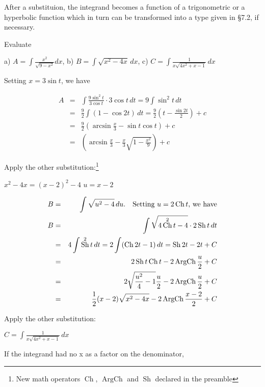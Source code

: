 \documentclass[11pt]{amsbook}
\DeclareMathOperator{\Ch}{Ch}
\DeclareMathOperator{\Sh}{Sh}
\DeclareMathOperator{\ArgCh}{ArgCh}
\begin{document}

After a substituion, the integrand becomes a function of a trigonometric or a hyperbolic function which in turn can be transformed into a type given in §7.2, if necessary.

\begin{exmp}
Evaluate\\
\par a) $A = \int \frac{x^2}{\sqrt{9-x^2}} dx $, 
\quad b) $B = \int \sqrt{x^2-4x}\, dx $,
\quad c) $C = \int \frac{1}{x\sqrt{4x^2+x-1}}\,dx$
\end{exmp}

\begin{hSolution}
\begin{hEnumerateAlpha}
\item Setting $x=3 \sin t$, we have

\begin{eqnarray*}
    A &=& \int \frac{9 \sin^2 t}{3 \cos t}\cdot 3\cos t \,dt = 9 \int \sin^2 t\, dt\\
    &=& \frac{9}{2}\int (1-\cos 2t) \,dt = \frac{9}{2}(t-\frac{\sin 2t}{2})+c\\
    &=& \frac{9}{2} (\arcsin \frac{x}{3}-\sin t \cos t)+c\\
    &=& (\arcsin \frac{x}{3} -\frac{x}{3}\sqrt{1-\frac{x^2}{9}})+c
\end{eqnarray*}

\par Apply the other substitution:\footnote{New math operators $\Ch$, $\ArgCh$ and $\Sh$ declared in the preamble}\\
\item \quad \quad $x^2-4x = (x-2)^2-4$ \quad \quad $u=x-2$

\begin{eqnarray*}
    B &=& \int \sqrt{u^2-4} \,du \text{.\quad Setting } u=2 \Ch t\text{, we have}\\
    B &=& \int \sqrt{4 \Ch^2 t-4} \cdot 2 \Sh t\, dt\\
    &=& 4 \int \Sh^2t \,dt = 2 \int (\Ch 2t-1) \,dt =\Sh 2t -2t +C\\
    &=& 2 \Sh t \Ch t - 2 \ArgCh \frac{u}{2} +C\\
    &=& 2\sqrt{\frac{u^2}{4}-1}\frac{u}{2}-2 \ArgCh \frac{u}{2}+C\\
    &=& \frac{1}{2}(x-2)\sqrt{x^2-4x}-2 \ArgCh\frac{x-2}{2}+C
\end{eqnarray*} 

Apply the other substitution:
\item \quad \quad $C=\int\frac{1}{x\sqrt{4x^2+x-1}}\,dx$
\par If the integrand had no x as a factor on the denominator,

\end{hEnumerateAlpha}
\end{hSolution}

\end{document}
